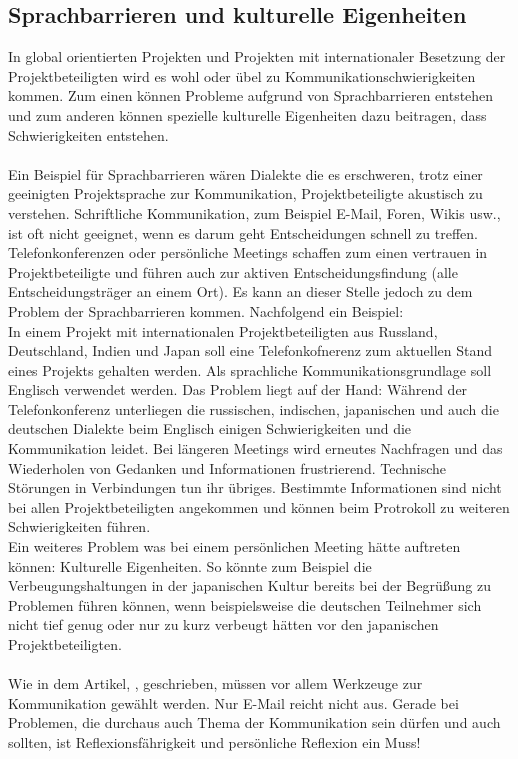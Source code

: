 \documentclass[11pt]{scrartcl}
\begin{document}
\subsection{Sprachbarrieren und kulturelle Eigenheiten}
In global orientierten Projekten und Projekten mit internationaler Besetzung der Projektbeteiligten wird es wohl oder übel zu Kommunikationschwierigkeiten kommen. Zum einen können Probleme aufgrund von Sprachbarrieren entstehen und zum anderen können spezielle kulturelle Eigenheiten dazu beitragen, dass Schwierigkeiten entstehen. \\
\\
Ein Beispiel für Sprachbarrieren wären Dialekte die es erschweren, trotz einer geeinigten Projektsprache zur Kommunikation, Projektbeteiligte akustisch zu verstehen. Schriftliche Kommunikation, zum Beispiel E-Mail, Foren, Wikis usw., ist oft nicht geeignet, wenn es darum geht Entscheidungen schnell zu treffen. Telefonkonferenzen oder persönliche Meetings schaffen zum einen vertrauen in Projektbeteiligte und führen auch zur aktiven Entscheidungsfindung (alle Entscheidungsträger an einem Ort). Es kann an dieser Stelle jedoch zu dem Problem der Sprachbarrieren kommen. Nachfolgend ein Beispiel: \\
In einem Projekt mit internationalen Projektbeteiligten aus Russland, Deutschland, Indien und Japan soll eine Telefonkofnerenz zum aktuellen Stand eines Projekts gehalten werden. Als sprachliche Kommunikationsgrundlage soll Englisch verwendet werden. Das Problem liegt auf der Hand: Während der Telefonkonferenz unterliegen die russischen, indischen, japanischen und auch die deutschen Dialekte beim Englisch einigen Schwierigkeiten und die Kommunikation leidet. Bei längeren Meetings wird erneutes Nachfragen und das Wiederholen von Gedanken und Informationen frustrierend. Technische Störungen in Verbindungen tun ihr übriges. Bestimmte Informationen sind nicht bei allen Projektbeteiligten angekommen und können beim Protrokoll zu weiteren Schwierigkeiten führen. \\
Ein weiteres Problem was bei einem persönlichen Meeting hätte auftreten können: Kulturelle Eigenheiten. So könnte zum Beispiel die Verbeugungshaltungen in der japanischen Kultur bereits bei der Begrüßung zu Problemen führen können, wenn beispielsweise die deutschen Teilnehmer sich nicht tief genug oder nur zu kurz verbeugt hätten vor den japanischen Projektbeteiligten. \\
\\
Wie in dem Artikel, \cite{nur_emails_sind_zu_wenig}, geschrieben, müssen vor allem Werkzeuge zur Kommunikation gewählt werden. Nur E-Mail reicht nicht aus. Gerade bei Problemen, die durchaus auch Thema der Kommunikation sein dürfen und auch sollten, ist Reflexionsfährigkeit und persönliche Reflexion ein Muss!
\end{document}
